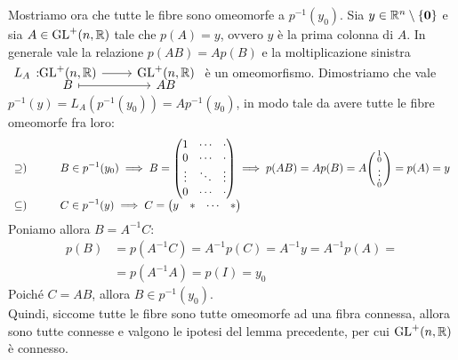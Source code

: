 \begin{demonstration}
	Mostriamo ora che tutte le fibre sono omeomorfe a $p^{-1}(y_0)$. Sia $y\in\mathbb{R}^n\setminus\{\mathbf{0}\}$ e sia $A\in\operatorname{GL}^+(n,\mathbb{R})$ tale che $p(A)=y$, ovvero $y$ è la prima colonna di $A$. In generale vale la relazione $p(AB)=Ap(B)$ e la moltiplicazione sinistra $\displaystyle \funztot {L_A} {\gl^+(n,\realset)} {\gl^+(n,\realset)} B {AB}$ è un omeomorfismo. Dimostriamo che vale $p^{-1}(y)=L_A\left( p^{-1}(y_0)\right)=Ap^{-1}(y_0)$, in modo tale da avere tutte le fibre omeomorfe fra loro:
	\begin{equation*}
		\begin{array}{ll}
			\supseteq)\quad & \displaystyle \quad B\in p^{-1}(y_0) \implies B=\begin{pmatrix}
				1	   & \cdots  & \cdot  \\
				0 	   & \cdots  & \cdot   \\
				\vdots & \ddots  & \vdots   \\
				0      & \cdots  & \cdot
			\end{pmatrix} \implies	p(AB)=Ap(B)=A\begin{psmallmatrix}
				1 \\ 0 \\ \vdots \\ 0
			\end{psmallmatrix}= p(A)=y\\
			\subseteq)\quad & \displaystyle \quad C\in p^{-1}(y) \implies C=\begin{pmatrix}
				y & * & \cdots & *
			\end{pmatrix}
		\end{array}
	\end{equation*}
Poniamo allora $B=A^{-1}C$:
			\begin{equation*}
				\begin{array}{ll}
					p(B)&=p(A^{-1}C)=A^{-1}p(C)=A^{-1}y=A^{-1}p(A)=\\
					&=p(A^{-1}A)=p(I)=y_0
				\end{array}
			\end{equation*}
	Poiché $C=AB$, allora $B\in p^{-1}(y_0)$.\\
	Quindi, siccome tutte le fibre sono tutte omeomorfe ad una fibra connessa, allora sono tutte connesse e valgono le ipotesi del lemma precedente, per cui $\operatorname{GL}^+(n,\mathbb{R})$ è connesso.
\end{demonstration}

